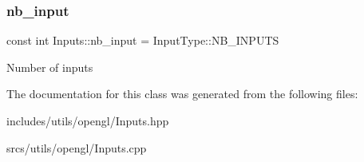\subsubsection{\texorpdfstring{nb\+\_\+input}{nb\_input}}
{\footnotesize\ttfamily const int Inputs\+::nb\+\_\+input = Input\+Type\+::\+N\+B\+\_\+\+I\+N\+P\+U\+TS\hspace{0.3cm}{\ttfamily [static]}}

Number of inputs 

The documentation for this class was generated from the following files\+:\begin{DoxyCompactItemize}
\item 
includes/utils/opengl/Inputs.\+hpp\item 
srcs/utils/opengl/Inputs.\+cpp\end{DoxyCompactItemize}
